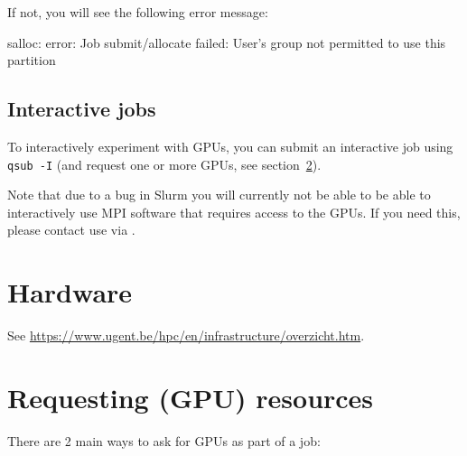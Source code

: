  If not, you will see the following error message:


\begin{prompt}
salloc: error:
Job submit/allocate failed: User's group not permitted to use this partition
\end{prompt}

\subsection{Interactive jobs}
\label{sec:gpu_ugent_interactive_jobs}

To interactively experiment with GPUs, you can submit an interactive job using \lstinline|qsub -I| (and request
one or more GPUs, see section~\ref{sec:gpu_ugent_resources}).

Note that due to a bug in Slurm you will currently not be able to be able to interactively use
MPI software that requires access to the GPUs. If you need this, please contact use via \hpcinfo.



\section{Hardware}

See \url{https://www.ugent.be/hpc/en/infrastructure/overzicht.htm}.




\section{Requesting (GPU) resources}
\label{sec:gpu_ugent_resources}

There are 2 main ways to ask for GPUs as part of a job:


